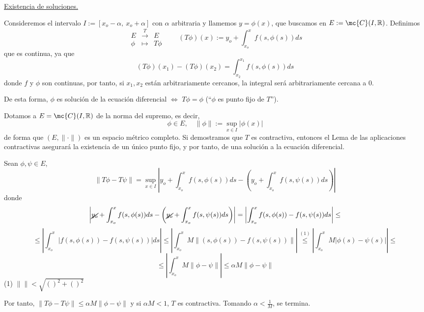 \underline{Existencia de soluciones.}

Consideremos el intervalo $I:=[x_o-\alpha, \:x_o+\alpha]$ con $\alpha$ arbitraria y llamemos $y=\phi(x)$, que buscamos en $E:=\mc{C}(I, \mathbb R)$. Definimos $$\begin{array}{rcl}
     E & \overset{T}{\longrightarrow} & E  \\
     \phi &  \longmapsto & T\phi
\end{array}  \qquad (T\phi)(x):=y_o + \int_{x_o}^x f(s,\phi(s))ds$$
que es continua, ya que $$(T\phi)(x_1)-(T\phi)(x_2)=\int_{x_2}^{x_1}f(s,\phi(s))ds$$
donde $f$ y $\phi$ son continuas, por tanto, si $x_1,x_2$ están arbitrariamente cercanos, la integral será arbitrariamente cercana a $0$.

De esta forma, $\phi$ es solución de la ecuación diferencial $\iff$ $T\phi=\phi$ (``$\phi$ es punto fijo de $T$'').

Dotamos a $E=\mc{C}(I, \mathbb R)$ de la norma del supremo, es decir,
$$\phi \in E, \quad \|\phi\|:=\underset{x \in I}{\sup}|\phi(x)|$$
de forma que $(E,\|\cdot \|)$ es un espacio métrico completo. Si demostramos que $T$ es contractiva, entonces el Lema de las aplicaciones contractivas asegurará la existencia de un único punto fijo, y por tanto, de una solución a la ecuación diferencial.

Sean $\phi, \psi \in E$, 
$$\|T\phi-T\psi\|=\underset{x \in I}{\sup}\left| y_o + \int_{x_o}^x f(s,\phi(s))ds - \left({y_o} + \int_{x_o}^x f(s,\psi(s))ds\right)\right|$$
donde 
$$\left| \cancel{y_o} + \int_{x_o}^x f(s,\phi(s))ds - \left(\cancel{y_o} + \int_{x_o}^x f(s,\psi(s))ds\right)\right|=\left|\int_{x_o}^xf(s,\phi(s))-f(s,\psi(s))ds\right|\leq $$
$$ \leq \left| \int_{x_o}^x \left| f(s,\phi(s))-f(s,\psi(s))\right|ds\right| \leq \left| \int_{x_o}^x M \|(s,\phi(s))-f(s,\psi(s))\|\right| \overset{(1)}{\leq} \left|\int_{x_o}^x M|\phi(s)-\psi(s)|\right| \leq$$$$ \leq \left| \int_{x_o}^x M \|\phi - \psi\|\right| \leq \alpha M \|\phi - \psi\| \label{demexuni}$$
(1) $\|\| < \sqrt{()^2+()^2}$

Por tanto, $\|T\phi-T\psi\| \leq \alpha M \|\phi - \psi\|$ y si $\alpha M < 1$, $T$ es contractiva. Tomando $\alpha<\frac{1}{M}$, se termina.

